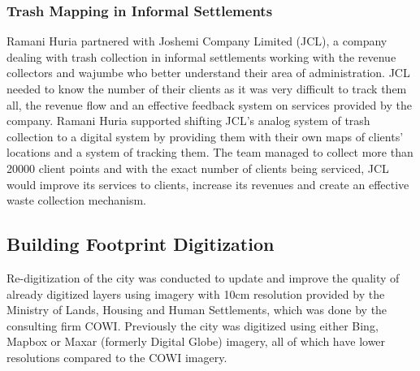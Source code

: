 \documentclass[a4paper,12pt,twoside]{article}
\begin{document}

\subsubsection{Trash Mapping in Informal Settlements}
\begin{multicols}{2}
Ramani Huria partnered with Joshemi Company Limited (JCL), a company dealing with trash collection in informal settlements working with the revenue collectors and wajumbe who better understand their area of administration. JCL needed to know the number of their clients as it was very difficult to track them all, the revenue flow and an effective feedback system on services provided by the company.
Ramani Huria supported shifting JCL’s analog system of trash collection to a digital system by providing them with their own maps of clients’ locations and a system of tracking them. The team managed to collect more than 20000 client points and with the exact number of clients being serviced, JCL would improve its services to clients, increase its revenues and create an effective waste collection mechanism.
\end{multicols}

\newpage
\subsection{Building Footprint Digitization}
\begin{multicols}{2}
Re-digitization of the city was conducted to update and improve the quality of already digitized layers using imagery with 10cm resolution provided by the Ministry of Lands, Housing and Human Settlements, which was done by the consulting firm COWI. Previously the city was digitized using either Bing, Mapbox or Maxar (formerly Digital Globe) imagery, all of which have lower resolutions compared to the COWI imagery.


\end{multicols}
\end{document}
\end{multicols}
\end{document}
